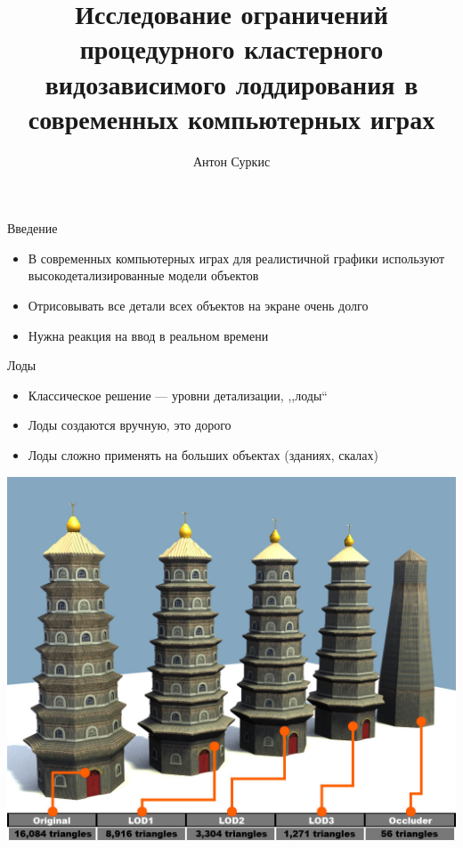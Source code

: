 \documentclass{beamer}
\title[Ограничения Nanite]{Исследование ограничений процедурного кластерного видозависимого лоддирования в современных компьютерных играх}
\author{Антон Суркис}
\begin{document}
    \maketitle

    \begin{frame}{Введение}
        \begin{itemize}
            \item В современных компьютерных играх для реалистичной графики используют высокодетализированные модели объектов
            \item Отрисовывать все детали всех объектов на экране очень долго
            \item Нужна реакция на ввод в реальном времени
        \end{itemize}
    \end{frame}

    \begin{frame}{Лоды}
        \begin{itemize}
            \item Классическое решение --- уровни детализации, ,,лоды``
            \item Лоды создаются вручную, это дорого
            \item Лоды сложно применять на больших объектах (зданиях, скалах)
        \end{itemize}
        \begin{center}
            \includegraphics[height=.625\textheight]{lod.jpg}
        \end{center}
    \end{frame}
\end{document}

